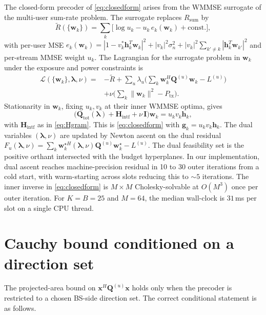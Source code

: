 \documentclass[journal,twocolumn,10pt]{IEEEtran}
\theoremstyle{plain}
\theoremstyle{remark}
\newcommand{\xx}{\mathbf{x}}
\newcommand{\hh}{\mathbf{h}}
\newcommand{\ww}{\mathbf{w}}
\newcommand{\gvec}{\mathbf{g}}
\newcommand{\Qmat}{\mathbf{Q}}
\newcommand{\Hintf}{\mathbf{H}_{\mathrm{intf}}}
\begin{document}
The closed-form precoder of \cref{eq:closedform} arises from the
WMMSE surrogate of the multi-user sum-rate problem. The surrogate
replaces $R_{\mathrm{sum}}$ by
\begin{equation}\label{eq:WMMSE-obj}
  \tilde R(\{\ww_k\}) = \sum_k\bigl[\log u_k - u_k\,e_k(\ww_k)
  + \mathrm{const.}\bigr],
\end{equation}
with per-user MSE
$e_k(\ww_k) = |1 - v_k^* \hh_k^T \ww_k|^2 + |v_k|^2 \sigma_n^2 +
|v_k|^2 \sum_{k' \neq k} |\hh_k^T \ww_{k'}|^2$ and per-stream MMSE
weight $u_k$. The Lagrangian for the surrogate problem in $\ww_k$
under the exposure and power constraints is
\begin{equation}\label{eq:lagrangian}
\begin{aligned}
\mathcal{L}(\{\ww_k\}, \bm\lambda, \nu)
={}& -\tilde R + \sum_u \lambda_u
  \biggl(\sum_k \ww_k^H \Qmat^{(u)} \ww_k - L^{(u)}\biggr) \\
& + \nu\biggl(\sum_k \|\ww_k\|^2 - P_{\mathrm{tx}}\biggr).
\end{aligned}
\end{equation}
Stationarity in $\ww_k$, fixing $u_k, v_k$ at their inner WMMSE
optima, gives
\begin{equation}\label{eq:KKT}
  \bigl(\Qmat_{\mathrm{tot}}(\bm\lambda) + \Hintf + \nu\,\mathbf{I}\bigr)
  \ww_k = u_k v_k \hh_k,
\end{equation}
with $\Hintf$ as in \cref{eq:Hgram}. This is \cref{eq:closedform}
with $\gvec_k = u_k v_k \hh_k$. The dual variables $(\bm\lambda, \nu)$
are updated by Newton ascent on the dual residual
$F_u(\bm\lambda, \nu) = \sum_k \ww_k^{\star H}(\bm\lambda, \nu)
\Qmat^{(u)} \ww_k^\star - L^{(u)}$. The dual feasibility set is the
positive orthant intersected with the budget hyperplanes. In our
implementation, dual ascent reaches machine-precision residual in
10 to 30 outer iterations from a cold start, with warm-starting
across slots reducing this to $\sim 5$ iterations. The inner inverse
in \cref{eq:closedform} is $M \times M$ Cholesky-solvable at
$O(M^3)$ once per outer iteration. For $K = B = 25$ and $M = 64$,
the median wall-clock is $31\,$ms per slot on a single CPU thread.


\section{Cauchy bound conditioned on a direction set}\label{app:cauchy}

The projected-area bound on $\xx^H \Qmat^{(u)} \xx$ holds only when
the precoder is restricted to a chosen BS-side direction set. The
correct conditional statement is as follows.
\end{document}
